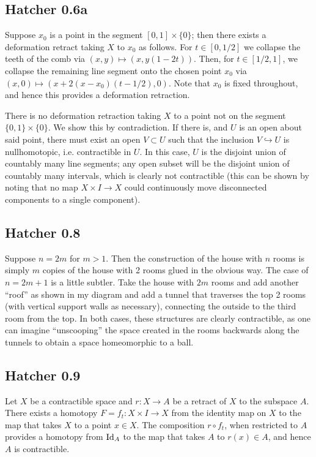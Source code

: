 \documentclass{../mathnotes}
\begin{document}
\subsection*{Hatcher 0.6a}
Suppose $x_0$ is a point in the segment $[0,1]\times\{0\}$; then there exists a deformation retract
taking $X$ to $x_0$ as follows. For $t\in[0,1/2]$ we collapse the teeth of the comb via
$(x,y)\mapsto (x,y(1-2t))$. Then, for $t\in[1/2,1]$, we collapse the remaining line segment onto
the chosen point $x_0$ via $(x,0)\mapsto(x+2(x-x_0)(t-1/2),0)$. Note that $x_0$ is fixed throughout,
and hence this provides a deformation retraction.

There is no deformation retraction taking $X$ to a point not on the segment $\{0,1\}\times\{0\}$.
We show this by contradiction. If there is, and $U$ is an open about said point, there must
exist an open $V\subset U$ such that the inclusion $V\hookrightarrow U$ is nullhomotopic,
i.e. contractible in $U$. In this case, $U$ is the disjoint union of countably many line segments;
any open subset will be the disjoint union of countably many intervals, which is clearly
not contractible (this can be shown by noting that no map $X\times I\to X$ could continuously
move disconnected components to a single component).

\subsection*{Hatcher 0.8}
Suppose $n=2m$ for $m>1$. Then the construction of the house with $n$ rooms is simply $m$ copies of
the house with 2 rooms glued in the obvious way. The case of $n=2m+1$ is a little subtler.
Take the house with $2m$ rooms and add another ``roof'' as shown in my diagram and add
a tunnel that traverses the top 2 rooms (with vertical support walls as necessary), connecting
the outside to the third room from the top. In both cases, these structures are clearly
contractible, as one can imagine ``unscooping'' the space created in the rooms backwards
along the tunnels to obtain a space homeomorphic to a ball.

\subsection*{Hatcher 0.9}
Let $X$ be a contractible space and $r:X\to A$ be a retract of $X$ to the subspace $A$.
There exists a homotopy $F=f_t:X\times I\to X$ from the identity map on $X$ to the map that
takes $X$ to a point $x\in X$. The composition $r\circ f_t$, when restricted to $A$ provides
a homotopy from $\operatorname{Id}_A$ to the map that takes $A$ to $r(x)\in A$, and hence $A$ is
contractible.
\end{document}
